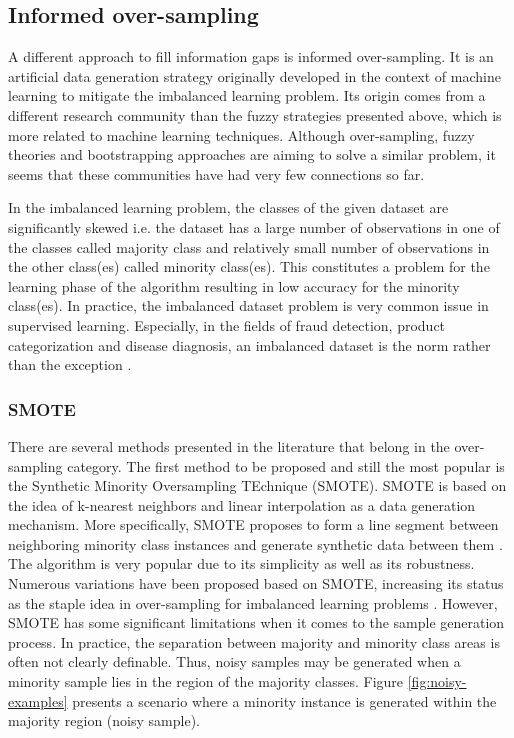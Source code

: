 \documentclass[parskip=full]{scrartcl}
\begin{document}
\subsection{Informed over-sampling}

A different approach to fill information gaps is informed over-sampling. It is
an artificial data generation strategy originally developed in the context of
machine learning to mitigate the imbalanced learning problem. Its origin comes
from a different research community than the fuzzy strategies presented above,
which is more related to machine learning techniques. Although over-sampling,
fuzzy theories and bootstrapping approaches are aiming to solve a similar
problem, it seems that these communities have had very few connections so far.

In the imbalanced learning problem, the classes of the given dataset are
significantly skewed i.e. the dataset has a large number of observations in one
of the classes called majority class and relatively small number of observations
in the other class(es) called minority class(es). This constitutes a problem for
the learning phase of the algorithm resulting in low accuracy for the minority
class(es). In practice, the imbalanced dataset problem is very common issue in
supervised learning. Especially, in the fields of fraud detection, product
categorization and disease diagnosis, an imbalanced dataset is the norm rather
than the exception \cite{He.2013}. 

\subsubsection{SMOTE}

There are several methods presented in the literature that belong in the
over-sampling category. The first method to be  proposed and still the most
popular is the Synthetic Minority Oversampling TEchnique (SMOTE). SMOTE is based
on the idea of k-nearest neighbors and linear interpolation as a data generation
mechanism. More specifically, SMOTE proposes to form a line segment between
neighboring minority class instances and generate synthetic data between them
\cite{Chawla.2002}. The algorithm is very popular due to its simplicity as well
as its robustness. Numerous variations have been proposed based on SMOTE,
increasing its status as the staple idea in over-sampling for imbalanced
learning problems \cite{Fernandez.2018}. However, SMOTE has some significant
limitations when it comes to the sample generation process. In practice, the
separation between majority and minority class areas is often not clearly
definable. Thus, noisy samples may be generated when a minority sample lies in
the region of the majority classes. Figure \ref{fig:noisy-examples} presents a
scenario where a minority instance is generated within the majority region
(noisy sample).
\end{document}
